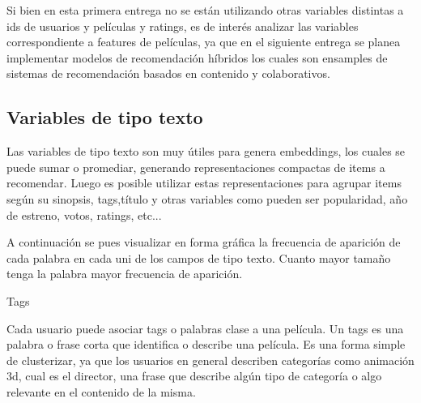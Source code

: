 \documentclass[11pt,a4paper,twoside]{thesis}
\begin{document}
Si bien en esta primera entrega no se están utilizando otras variables distintas a ids de usuarios y películas y ratings, es de interés analizar las variables correspondiente a features de películas, ya que en el siguiente entrega se planea implementar modelos de recomendación híbridos los cuales son ensamples de sistemas de recomendación basados en contenido y colaborativos.

\subsection{Variables de tipo texto}

Las variables de tipo texto son muy útiles para genera embeddings, los cuales se puede sumar o promediar, generando representaciones compactas de items a recomendar. Luego es posible utilizar estas representaciones para agrupar items según su sinopsis, tags,título y otras variables como pueden ser popularidad, año de estreno, votos, ratings, etc...

A continuación se pues visualizar en forma gráfica la frecuencia de aparición de cada palabra en cada uni de los campos de tipo texto. Cuanto mayor tamaño tenga la palabra mayor frecuencia de aparición.

\begin{description}
	\item[Tags]
\end{description}

Cada usuario puede asociar tags o palabras clase a una película. Un tags es una palabra o frase corta que identifica o describe una película. Es una forma simple de clusterizar, ya que los usuarios en general describen categorías como animación 3d, cual es el director, una frase que describe algún tipo de categoría o algo relevante en el contenido de la misma. 
\end{document}
